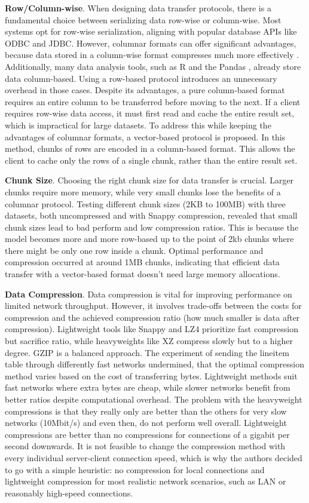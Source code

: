 \documentclass[sigconf]{acmart}
\begin{document}
\textbf{Row/Column-wise}. 
When designing data transfer protocols, there is a fundamental choice between serializing data row-wise or column-wise. Most systems opt for row-wise serialization, aligning with popular database APIs like ODBC and JDBC. However, columnar formats can offer significant advantages, because data stored in a column-wise format compresses much more effectively \cite{abadi2006integrating}. Additionally, many data analysis tools, such as R \cite{rcore2016} and the Pandas \cite{mckinney2010data}, already store data column-based. Using a row-based protocol introduces an unnecessary overhead in those cases.
Despite its advantages, a pure column-based format requires an entire column to be transferred before moving to the next. If a client requires row-wise data access, it must first read and cache the entire result set, which is impractical for large datasets.
To address this while keeping the advantages of columnar formats, a vector-based protocol is proposed. In this method, chunks of rows are encoded in a column-based format. This allows the client to cache only the rows of a single chunk, rather than the entire result set.

\textbf{Chunk Size}.
Choosing the right chunk size for data transfer is crucial. Larger chunks require more memory, while very small chunks lose the benefits of a columnar protocol. Testing different chunk sizes (2KB to 100MB) with three datasets, both uncompressed and with Snappy \cite{snappy2016} compression, revealed that small chunk sizes lead to bad perform and low compression ratios. This is because the model becomes more and more row-based up to the point of 2kb chunks where there might be only one row inside a chunk. Optimal performance and compression occurred at around 1MB chunks, indicating that efficient data transfer with a vector-based format doesn't need large memory allocations.

\textbf{Data Compression}.
Data compression is vital for improving performance on limited network throughput. However, it involves trade-offs between the costs for compression and the achieved compression ratio (how much smaller is data after compression). Lightweight tools like Snappy and LZ4 \cite{lz42013} prioritize fast compression but sacrifice ratio, while heavyweights like XZ compress slowly but to a higher degree. GZIP \cite{gzip1993} is a balanced approach.
The experiment of sending the lineitem table through differently fast networks undermined, that the optimal compression method varies based on the cost of transferring bytes. Lightweight methods suit fast networks where extra bytes are cheap, while slower networks benefit from better ratios despite computational overhead. The problem with the heavyweight compressions is that they really only are better than the others for very slow networks (10Mbit/s) and even then, do not perform well overall. Lightweight compressions are better than no compressions for connections of a gigabit per second downwards.
It is not feasible to change the compression method with every individual server-client connection speed, which is why the authors decided to go with a simple heuristic: no compression for local connections and lightweight compression for most realistic network scenarios, such as LAN or reasonably high-speed connections.
\end{document}
